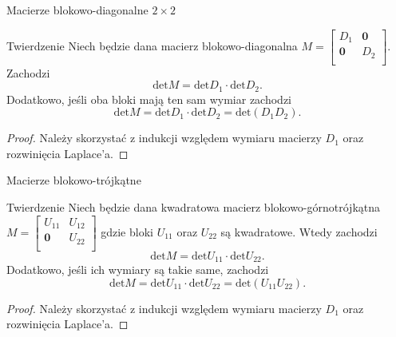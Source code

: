 \documentclass{beamer}
\newcommand{\zero}{\mathbf{0}}
\renewcommand{\det}{\textrm{det}}
\begin{document}
\begin{frame}{Macierze blokowo-diagonalne $2 \times 2$}
    \begin{block}{Twierdzenie}
        Niech będzie dana macierz blokowo-diagonalna $M = \begin{bmatrix}
            D_1 & \zero \\ \zero& D_2 \\ 
        \end{bmatrix}$. Zachodzi 
        $$ \det M = \det D_1 \cdot \det D_2 .$$
         Dodatkowo, jeśli oba bloki mają ten sam wymiar zachodzi $$ \det M = \det D_1 \cdot \det D_2 =  \det(D_1  D_2).$$
    \end{block}
    \pause
    \begin{proof}
        Należy skorzystać z indukcji względem wymiaru macierzy $D_1$ oraz rozwinięcia Laplace'a.
    \end{proof}
\end{frame}

\begin{frame}{Macierze blokowo-trójkątne}
    \begin{block}{Twierdzenie}
        Niech będzie dana kwadratowa macierz blokowo-górnotrójkątna $M = \begin{bmatrix}
            U_{11} & U_{12} \\  \zero & U_{22} \\ 
        \end{bmatrix}$ gdzie bloki $U_{11}$ oraz $U_{22}$ są kwadratowe. Wtedy zachodzi 
        $$\det M = \det U_{11} \cdot \det U_{22}.$$ 
        Dodatkowo, jeśli ich wymiary są takie same, zachodzi 
        $$\det M = \det U_{11} \cdot \det U_{22} = \det (U_{11} U_{22}).$$
    \end{block}
    \pause
    \begin{proof}
        Należy skorzystać z indukcji względem wymiaru macierzy $D_1$ oraz rozwinięcia Laplace'a.
    \end{proof}
\end{frame}
\end{document}
